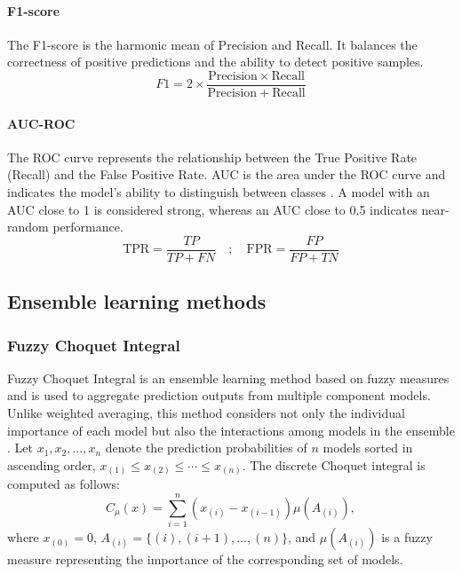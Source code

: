 \documentclass[10pt,twoside]{article}
\begin{document}
\paragraph{F1-score}
The F1-score \cite{grandini_metrics_2020} is the harmonic mean of Precision and Recall. It balances the correctness of positive predictions and the ability to detect positive samples.
\begin{equation}
F1=2\times\frac{\mathrm{Precision}\times\mathrm{Recall}}{\mathrm{Precision}+\mathrm{Recall}}
\end{equation}
\paragraph{AUC-ROC}
The ROC curve represents the relationship between the True Positive Rate (Recall) and the False Positive Rate. AUC is the area under the ROC curve and indicates the model's ability to distinguish between classes \cite{fawcett_introduction_2006}. A model with an AUC close to 1 is considered strong, whereas an AUC close to 0.5 indicates near-random performance.
\begin{equation}
\mathrm{TPR}=\frac{TP}{TP+FN}\quad;\quad \mathrm{FPR}=\frac{FP}{FP+TN}
\end{equation}

\subsection{Ensemble learning methods}
\subsubsection{Fuzzy Choquet Integral}
Fuzzy Choquet Integral is an ensemble learning method based on fuzzy measures and is used to aggregate prediction outputs from multiple component models. Unlike weighted averaging, this method considers not only the individual importance of each model but also the interactions among models in the ensemble \cite{zadeh_fuzzy_1965, choquet_theory_1954}. Let $x_1, x_2, \ldots, x_n$ denote the prediction probabilities of $n$ models sorted in ascending order, $x_{(1)} \leq x_{(2)} \leq \cdots \leq x_{(n)}$. The discrete Choquet integral is computed as follows:
\begin{equation} C_{\mu}(x) = \sum_{i=1}^{n} \left(x_{(i)} - x_{(i-1)}\right)\mu(A_{(i)}), \end{equation}
where $x_{(0)}=0$, $A_{(i)}=\{(i),(i+1),\ldots,(n)\}$, and $\mu(A_{(i)})$ is a fuzzy measure representing the importance of the corresponding set of models.
\end{document}
